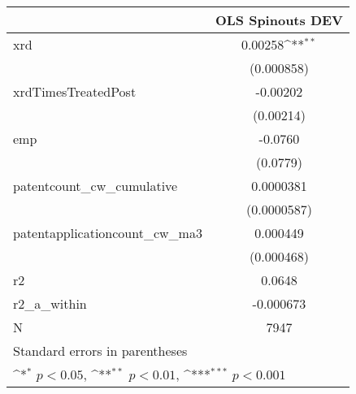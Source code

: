 {
\def\sym#1{\ifmmode^{#1}\else\(^{#1}\)\fi}
\begin{tabular}{l*{1}{c}}
\hline\hline
            &\multicolumn{1}{c}{OLS Spinouts DEV}\\
\hline
xrd         &     0.00258\sym{**} \\
            &  (0.000858)         \\
[1em]
xrdTimesTreatedPost&    -0.00202         \\
            &   (0.00214)         \\
[1em]
emp         &     -0.0760         \\
            &    (0.0779)         \\
[1em]
patentcount\_cw\_cumulative&   0.0000381         \\
            & (0.0000587)         \\
[1em]
patentapplicationcount\_cw\_ma3&    0.000449         \\
            &  (0.000468)         \\
\hline
r2          &      0.0648         \\
r2\_a\_within &   -0.000673         \\
N           &        7947         \\
\hline\hline
\multicolumn{2}{l}{\footnotesize Standard errors in parentheses}\\
\multicolumn{2}{l}{\footnotesize \sym{*} \(p<0.05\), \sym{**} \(p<0.01\), \sym{***} \(p<0.001\)}\\
\end{tabular}
}
